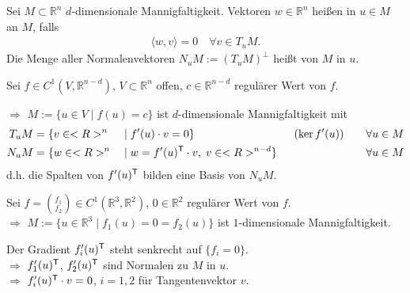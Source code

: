 \begin{*definition}
	Sei $M\subset\mathbb{R}^n$ $d$-dimensionale Mannigfaltigkeit. Vektoren $w\in\mathbb{R}^n$ heißen  in $u\in M$ an $M$, falls \begin{align*}
		\langle w,v\rangle = 0 \quad\forall v\in T_u M.
	\end{align*}
	Die Menge aller Normalenvektoren $N_u M := (T_u M)^{\perp}$ heißt  von $M$ in $u$.
\end{*definition}

\begin{proposition}
	Sei $f\in C^1(V, \mathbb{R}^{n-d})$, $V\subset\mathbb{R}^n$ offen, $c\in\mathbb{R}^{n-d}$ regulärer Wert von $f$.\par
	\hspace*{1mm}$\Rightarrow$ $M:= \{ u\in V \mid f(u) = c \}$ ist $d$-dimensionale Mannigfaltigkeit mit \begin{alignat*}{6}
		T_u M &= \{ v\in<R>^n  &\;\mid\;& f'(u)\cdot v = 0 \}&\;\; & (\ker f'(u))&\quad & \forall u\in M \\
		N_u M &= \{ w\in <R>^n &\;\mid\;& w = f'(u)^\mathsf{T}\cdot v,\; v\in<R>^{n-d}\}& & && \forall u\in M
	\end{alignat*}
	d.h. die Spalten von $f'(u)^\mathsf{T}$ bilden eine Basis von $N_u M$.
\end{proposition}

\begin{example}
	Sei $f= \binom{f_1}{f_2}\in C^1(\mathbb{R}^3,\mathbb{R}^2)$, $0\in\mathbb{R}^2$ regulärer Wert von $f$.\\
	\hspace*{1mm}$\Rightarrow$ $M:= \{ u\in\mathbb{R}^3 \mid f_1(u) = 0 = f_2(u)\}$ ist $1$-dimensionale Mannigfaltigkeit.
	
	Der Gradient $f_i'(u)^\mathsf{T}$ steht senkrecht auf $\{ f_i = 0\}$. \\
	\hspace*{1mm}$\Rightarrow$ $f_1'(u)^\mathsf{T}$, $f_2'(u)^\mathsf{T}$ sind Normalen zu $M$ in $u$.\\
	\hspace*{1mm}$\Rightarrow$ $f_i'(u)^\mathsf{T}\cdot v = 0$, $i=1,2$ für Tangentenvektor $v$.
\end{example}

